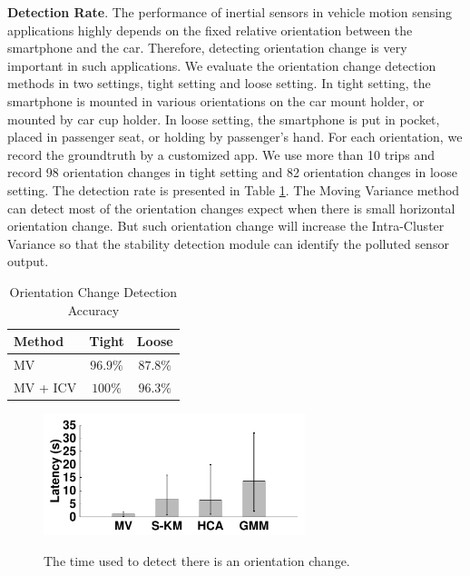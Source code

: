\textbf{Detection Rate}.
The performance of inertial sensors in vehicle
motion sensing applications highly depends
on the fixed relative orientation between
the smartphone and the car. 
Therefore, detecting orientation change is 
very important in such applications. 
We evaluate the orientation change detection methods 
in two settings, tight setting and loose setting. 
In tight setting, the smartphone is mounted in 
various orientations on the car mount holder, 
or mounted by car cup holder. 
In loose setting, the smartphone is put in 
pocket, placed in passenger seat, or holding by 
passenger's hand. 
For each orientation, we record 
the groundtruth by a customized app. 
We use more than 10 trips and record
98 orientation changes in tight setting 
and 82 orientation changes in loose setting. 
The detection rate is presented in Table \ref{evaluate_change}. 
The Moving Variance method can detect most
of the orientation changes expect when 
there is small horizontal orientation change. 
But such orientation change will increase the 
Intra-Cluster Variance so that the stability 
detection module can identify
the polluted sensor output. 


\begin{table}[!htbp]
        \vspace{0.5cm}
        \centering
        \caption[evaluate_change]{Orientation Change Detection Accuracy}
         \vspace{0.0cm}
        \label{evaluate_change}
                \begin{tabular}{|l|c|c|}
                \hline
Method & Tight & Loose
\\  \hline      \hline
MV & $96.9\%$  &  $87.8\%$ 
\\  \hline
MV + ICV & $100\%$ & $96.3\%$   
\\  \hline
     \end{tabular}
\end{table}


 



\begin{figure}[!htbp]
\begin{center}
\includegraphics[width=3.0in,angle=0]{Figs/DriveSense/clustering_methods.pdf}
\vspace{0.0cm}
\caption{The time used to detect there is an orientation change.}
\vspace{-0.2cm}
\label{evaluate_latency}
\end{center}
\end{figure}


